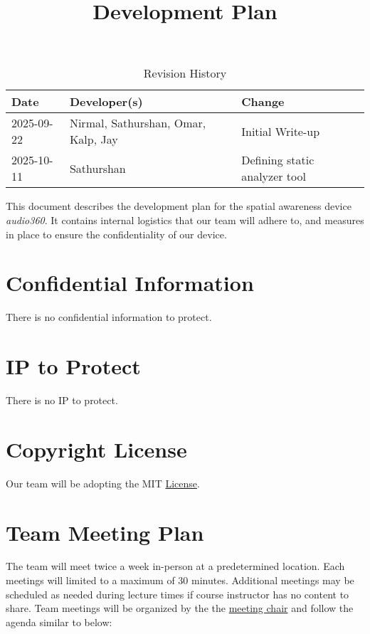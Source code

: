 \documentclass{article}
\title{Development Plan\\\progname}
\author{\authname}
\date{}
\begin{document}
\maketitle

\newpage{}

\begin{table}[hp]
\caption{Revision History} \label{TblRevisionHistory}
\begin{tabularx}{\textwidth}{llX}
\toprule
\textbf{Date} & \textbf{Developer(s)} & \textbf{Change}\\
\midrule
2025-09-22 & Nirmal, Sathurshan, Omar, Kalp, Jay & Initial Write-up\\
2025-10-11 & Sathurshan & Defining static analyzer tool\\
\bottomrule
\end{tabularx}
\end{table}

\newpage{}

This document describes the development plan for the spatial awareness device
\textit{audio360}. It contains internal logistics that our team will adhere to,
and measures in place to ensure the confidentiality of our device.

\section{Confidential Information}

There is no confidential information to protect.

\section{IP to Protect}

There is no IP to protect.

\section{Copyright License}

Our team will be adopting the MIT
\href{https://github.com/Nirmal-code/SixSense/blob/main/LICENSE}{License}.

\section{Team Meeting Plan}

The team will meet twice a week in-person at a predetermined location. Each
meetings will limited to a maximum of 30 minutes. Additional meetings may be
scheduled as needed during lecture times if course instructor has no content to
share. Team meetings will be organized by the the
\hyperref[role:meeting_chair]{meeting chair} and follow the agenda similar to
below:
\end{document}
